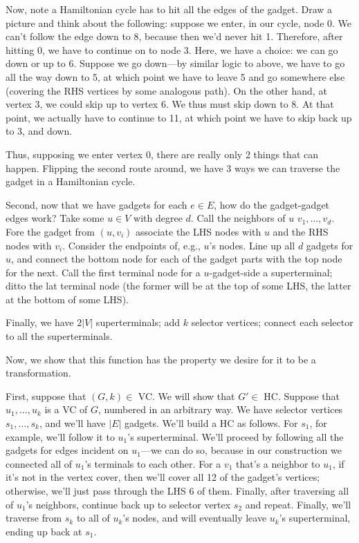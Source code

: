\documentclass{article}
\begin{document}
Now, note a Hamiltonian cycle has to hit all the edges of the gadget.
Draw a picture and think about the following:
suppose we enter, in our cycle, node 0. We can't follow the edge down to
8, because then we'd never hit 1.
Therefore, after hitting 0, we have to continue on to node 3.
Here, we have a choice: we can go down or up to 6.
Suppose we go down---by similar logic to above, we have to go all the way down to 5,
at which point we have to leave 5 and go somewhere else (covering the
RHS vertices by some analogous path).
On the other hand, at vertex 3, we could skip up to vertex 6. We thus must
skip down to 8. At that point, we actually have to continue to 11, at which
point we have to skip back up to 3, and down.

Thus, supposing we enter vertex 0, there are really only 2 things that can 
happen.
Flipping the second route around, we have 3 ways we can traverse the
gadget in a Hamiltonian cycle.

Second, now that we have gadgets for each $e\in E$, how do the gadget-gadget 
edges work?
Take some $u\in V$ with degree $d$. Call the neighbors of $u$
$v_1,\ldots,v_d$.
Fore the gadget from $(u,v_i)$ associate the LHS nodes with $u$ and the
RHS nodes with $v_i$.
Consider the endpoints of, e.g., $u$'s nodes.
Line up all $d$ gadgets for $u$, and connect the bottom node for
each of the gadget parts with the top node for the next.
Call the first terminal node for a $u$-gadget-side a superterminal; ditto
the lat terminal node (the former will be at the top of some LHS, the
latter at the bottom of some LHS).

Finally, we have $2|V|$ superterminals; add $k$ selector vertices;
connect each selector to all the superterminals.

Now, we show that this function has the property we desire for it
to be a transformation.

First, suppose that $(G,k)\in$ VC. We will show that $G'\in$ HC.
Suppose that $u_1,\ldots,u_k$ is a VC of $G$, numbered in an arbitrary
way.
We have selector vertices $s_1,\ldots,s_k$, and we'll have $|E|$ gadgets.
We'll build a HC as follows.
For $s_1$, for example, we'll follow it to $u_1$'s superterminal.
We'll proceed by following all the gadgets for edges incident on
$u_1$---we can do so, because in our construction we connected all of
$u_1$'s terminals to each other.
For a $v_1$ that's a neighbor to $u_1$, if it's not in the vertex
cover, then we'll cover all 12 of the gadget's vertices; otherwise,
we'll just pass through the LHS 6 of them.
Finally, after traversing all of $u_1$'s neighbors, continue back up
to selector vertex $s_2$ and repeat.
Finally, we'll traverse from $s_k$ to all of $u_k$'s nodes, and will eventually
leave $u_k$'s superterminal, ending up back at $s_1$.
\end{document}

